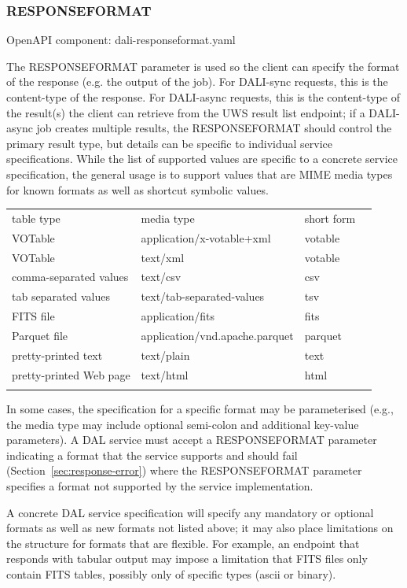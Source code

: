 \documentclass[11pt,letter]{ivoa}
\begin{document}
\subsubsection{RESPONSEFORMAT}
\label{sec:RESPONSEFORMAT}
OpenAPI component: dali-responseformat.yaml

The RESPONSEFORMAT parameter is used so the client can specify the format of the
response (e.g. the output of the job). For DALI-sync requests, this is the
content-type of the response. For DALI-async requests, this is the content-type
of the result(s) the client can retrieve from the UWS result list
endpoint; if a DALI-async job creates multiple results, the RESPONSEFORMAT
should control the primary result type, but details can be specific to
individual service specifications. While the list of supported values are
specific to a concrete service specification, the general usage is to support
values that are MIME media types \citep{std:MIME} for known
formats as well as
shortcut symbolic values.

\noindent
\begin{tabular}{l l l l}
\sptablerule
table type & media type & short form \\
\sptablerule
VOTable & application/x-votable+xml & votable \\
VOTable & text/xml & votable \\
comma-separated values & text/csv & csv \\
tab separated values & text/tab-separated-values & tsv \\
FITS file & application/fits & fits \\
Parquet file & application/vnd.apache.parquet & parquet \\
pretty-printed text & text/plain & text \\
pretty-printed Web page & text/html & html \\
\sptablerule
\label{tab:mimetypes}
\end{tabular}

In some cases, the specification for a specific format may be parameterised
(e.g., the media type may include optional semi-colon and additional key-value
parameters). A DAL service must accept a RESPONSEFORMAT parameter indicating a
format that the service supports and should  fail (Section~\ref{sec:response-error})
where the RESPONSEFORMAT parameter specifies a format not supported by the service
implementation.

A concrete DAL service specification will specify any mandatory or optional
formats as well as new formats not listed above; it may also place limitations
on the structure for formats that are flexible.  For example, an endpoint that
responds with tabular output may impose a limitation that FITS files only
contain FITS tables, possibly only of specific types (ascii or binary).
\end{document}
